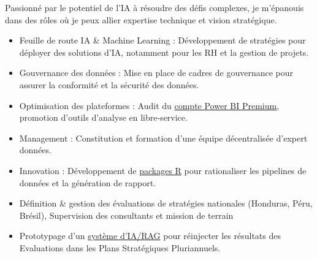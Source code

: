 \documentclass[10pt,a4paper,ragged2e,withhyper]{altacv}
\begin{document}
\begin{paracol}{2}

Passionné par le potentiel de l'IA à résoudre des défis complexes, je m'épanouis dans des rôles où je peux allier expertise technique et vision stratégique.


\begin{itemize}

\item  Feuille de route IA & Machine Learning : Développement de stratégies pour déployer des solutions d'IA, notamment pour les RH et la gestion de projets.

\item  Gouvernance des données : Mise en place de cadres de gouvernance pour assurer la conformité et la sécurité des données.

\item  Optimisation des plateformes : Audit du \href{https://github.com/iom/powerBI_audit}{compte Power BI Premium}, promotion d'outils d'analyse en libre-service.

\item Management : Constitution et formation d'une équipe décentralisée d'expert données.

\item Innovation : Développement de \href{https://github.com/orgs/iom/repositories}{packages R} pour rationaliser les pipelines de données et la génération de rapport.


\end{itemize}

\divider

\begin{itemize}
\item Définition \& gestion des évaluations de stratégies nationales (Honduras, Péru, Brésil), Supervision des consultants et mission de terrain
\item Prototypage d'un \href{https://edouard-legoupil.github.io/rag_extraction/}{système d'IA/RAG} pour réinjecter les résultats des Evaluations dans les Plans Stratégiques Pluriannuels.
\end{itemize}


\end{paracol}
\end{document}
